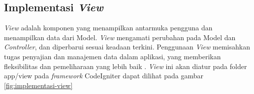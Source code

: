 
\subsection{Implementasi \textit{View}}
\textit{View }adalah komponen yang menampilkan antarmuka pengguna dan menampilkan data dari Model. \textit{View} mengamati perubahan pada Model dan \textit{Controller}, dan diperbarui sesuai keadaan terkini. Penggunaan \textit{View} memisahkan tugas penyajian dan manajemen data dalam aplikasi, yang memberikan fleksibilitas dan pemeliharaan yang lebih baik \cite{firdaus2020rancang}. \textit{View} ini akan diatur pada folder app/view pada \textit{framework} CodeIgniter dapat dilihat pada gambar \ref{fig:implementasi-view}



